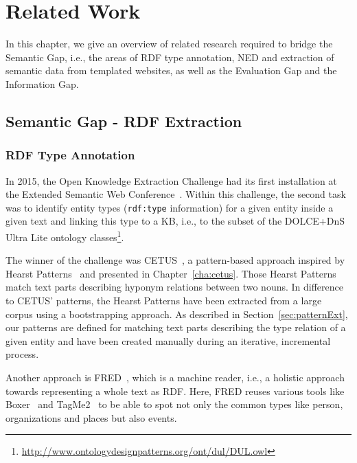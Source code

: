 \chapter{Related Work}



In this chapter, we give an overview of related research required to bridge the Semantic Gap, i.e., the areas of \ac{RDF} type annotation, \ac{NED} and extraction of semantic data from templated websites, as well as the Evaluation Gap and the Information Gap.

\section{Semantic Gap - RDF Extraction}
\subsection{RDF Type Annotation}

In 2015, the {Open Knowledge Extraction Challenge} had its first installation at the Extended Semantic Web Conference~\cite{okechallenge}.
Within this challenge, the second task was to identify entity types (\texttt{rdf:type} information) for a given entity inside a given text and linking this type to a \ac{KB}, i.e., to the subset of the DOLCE+DnS Ultra Lite ontology classes\footnote{\url{http://www.ontologydesignpatterns.org/ont/dul/DUL.owl}}.

The winner of the challenge was CETUS~\cite{CETUS_2015}, a pattern-based approach inspired by  Hearst Patterns~\cite{Hearst1992} and presented in Chapter~\ref{cha:cetus}.
Those Hearst Patterns match text parts describing hyponym relations between two nouns.
In difference to CETUS' patterns, the Hearst Patterns have been extracted from a large corpus using a bootstrapping approach.
As described in Section~\ref{sec:patternExt}, our patterns are defined for matching text parts describing the type relation of a given entity and have been created manually during an iterative, incremental process.

Another approach is FRED~\cite{fred_typing}, which is a machine reader, i.e., a holistic approach towards representing a whole text as \ac{RDF}. 
Here, FRED reuses various tools like Boxer~\citep{Bos:2008:WSA:1626481.1626503} and TagMe2~\cite{TagMe2} to be able to spot not only the common types like person, organizations and places but also events.

